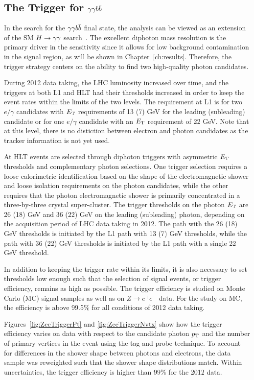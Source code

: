 \subsection{The Trigger for $\gamma\gamma b\bar{b}$}

In the search for the $\gamma\gamma b\bar{b}$ final state, the analysis can be viewed as an extension of the
SM $H\to\gamma\gamma$ search~\cite{HggCMSpaper}. The excellent diphoton mass
resolution is the primary driver in the sensitivity since it allows for low background contamination
in the signal region, as will be shown in Chapter~\ref{ch:results}.
Therefore, the trigger strategy centers on the ability to find two high-quality photon candidates.

During 2012 data taking, the LHC luminosity increased over time, and the triggers at both L1 and HLT
had their thresholds increased in order to keep the event rates within the limits of the two levels.
The requirement at L1 is for two $e/\gamma$ candidates with $E_{\rm T}$ requirements of 13 (7) GeV
for the leading (subleading) candidate or for one $e/\gamma$ candidate with an $E_{\rm T}$ requirement of
22 GeV. Note that at this level, there is no distiction between electron and photon candidates as
the tracker information is not yet used.

At HLT events are selected through diphoton triggers with asymmetric $E_{\rm T}$ thresholds
and complementary photon selections. One trigger selection requires a loose calorimetric
identification based on the shape of the electromagnetic shower and loose isolation requirements
on the photon candidates, while the other requires that the photon electromagnetic shower
is primarily concentrated in a three-by-three crystal super-cluster.
The trigger thresholds on the photon $E_{\rm T}$ are 26 (18) GeV and 36 (22) GeV on the leading
(subleading) photon, depending on the acquisition period of LHC data taking in 2012.
The path with the 26 (18) GeV thresholds is initiated by the L1 path with 13 (7) GeV thresholds, while
the path with 36 (22) GeV thresholds is initiated by the L1 path with a single 22 GeV threshold.

In addition to keeping the trigger rate within its limits, it is also necessary to set thresholds
low enough such that the selection of signal events, or trigger efficiency,
remains as high as possible. The trigger efficiency
is studied on Monte Carlo (MC) signal samples as well as on $Z\rightarrow e^+ e^-$ data.
For the study on MC, the efficiency is above 99.5\% for all conditions of 2012 data taking.

Figures~\ref{fig:ZeeTriggerPt} and \ref{fig:ZeeTriggerNvtx}
show how the trigger efficiency varies on data with respect to the
candidate photon $p_{\rm T}$ and the number of primary vertices in the event
using the tag and probe technique. To account for differences
in the shower shape between photons and electrons, the data sample was reweighted such that the shower
shape distributions match.
Within uncertainties, the trigger efficiency is higher than 99\% for the 2012 data.

